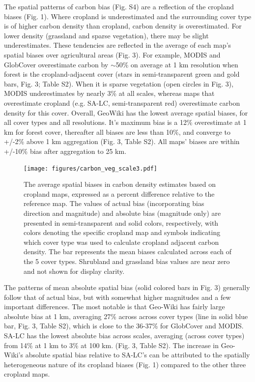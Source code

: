 \documentclass{pnastwo}
\begin{document}
\begin{article}
The spatial patterns of carbon bias (Fig. S4) are a reflection of the cropland biases (Fig. 1). Where cropland is underestimated and the surrounding cover type is of higher carbon density than cropland, carbon density is overestimated. For lower density (grassland and sparse vegetation), there may be slight underestimates.  These tendencies are reflected in the average of each map's spatial biases over agricultural areas (Fig. 3).  For example, MODIS and GlobCover overestimate carbon by $\sim$50\% on average at 1 km resolution when forest is the cropland-adjacent cover (stars in semi-transparent green and gold bars, Fig. 3; Table S2). When it is sparse vegetation (open circles in Fig. 3), MODIS underestimates by nearly 3\% at all scales, whereas maps that overestimate cropland (e.g. SA-LC, semi-transparent red) overestimate carbon density for this cover.  Overall, GeoWiki has the lowest average spatial biases, for all cover types and all resolutions. It's maximum bias is a 12\% overestimate at 1 km for forest cover, thereafter all biases are less than 10\%, and converge to +/-2\% above 1 km aggregation (Fig. 3, Table S2). All maps' biases are within +/-10\% bias after aggregation to 25 km.

\vspace{-0.9 cm}
\begin{figure}[ht]
\centerline{\texttt{[image: figures/carbon\_veg\_scale3.pdf]}}
\caption{The average spatial biases in carbon density estimates based on cropland maps, expressed as a percent difference relative to the reference map. The values of actual bias (incorporating bias direction and magnitude) and absolute bias (magnitude only) are presented in semi-transparent and solid colors, respectively, with colors denoting the specific cropland map and symbols indicating which cover type was used to calculate cropland adjacent carbon density. The bar represents the mean biases calculated across each of the 5 cover types. Shrubland and grassland bias values are near zero and not shown for display clarity.}
\label{afoto}
\end{figure}

The patterns of mean absolute spatial bias (solid colored bars in Fig. 3) generally follow that of actual bias, but with somewhat higher magnitudes and a few important differences. The most notable is that Geo-Wiki has fairly large absolute bias at 1 km, averaging 27\% across across cover types (line in solid blue bar, Fig. 3, Table S2), which is close to the 36-37\% for GlobCover and MODIS. SA-LC has the lowest absolute bias across scales, averaging (across cover types) from 14\% at 1 km to 3\% at 100 km. (Fig. 3, Table S2). The increase in Geo-Wiki's absolute spatial bias relative to SA-LC's can be attributed to the spatially heterogeneous nature of its cropland biases (Fig. 1) compared to the other three cropland maps.


\end{article}
\end{document}
